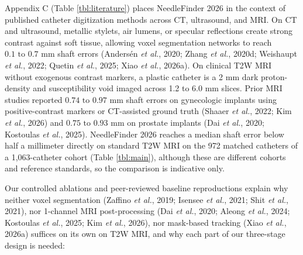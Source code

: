 \documentclass[
  11pt,
]{article}
\begin{document}
Appendix C (Table \ref{tbl:literature}) places NeedleFinder 2026 in the
context of published catheter digitization methods across CT,
ultrasound, and MRI. On CT and ultrasound, metallic stylets, air lumens,
or specular reflections create strong contrast against soft tissue,
allowing voxel segmentation networks to reach
\(0.1\text{ to }0.7\text{ mm}\) shaft errors (Andersén \emph{et al.},
2020; Zhang \emph{et al.}, 2020d; Weishaupt \emph{et al.}, 2022; Quetin
\emph{et al.}, 2025; Xiao \emph{et al.}, 2026a). On clinical T2W MRI
without exogenous contrast markers, a plastic catheter is a 2 mm dark
proton-density and susceptibility void imaged across 1.2 to 6.0 mm
slices. Prior MRI studies reported \(0.74\text{ to }0.97\text{ mm}\)
shaft errors on gynecologic implants using positive-contrast markers or
CT-assisted ground truth (Shaaer \emph{et al.}, 2022; Kim \emph{et al.},
2026) and \(0.75\text{ to }0.93\text{ mm}\) on prostate implants (Dai
\emph{et al.}, 2020; Kostoulas \emph{et al.}, 2025). NeedleFinder 2026
reaches a median shaft error below half a millimeter directly on
standard T2W MRI on the 972 matched catheters of a 1,063-catheter cohort
(Table \ref{tbl:main}), although these are different cohorts and
reference standards, so the comparison is indicative only.

Our controlled ablations and peer-reviewed baseline reproductions
explain why neither voxel segmentation (Zaffino \emph{et al.}, 2019;
Isensee \emph{et al.}, 2021; Shit \emph{et al.}, 2021), nor 1-channel
MRI post-processing (Dai \emph{et al.}, 2020; Aleong \emph{et al.},
2024; Kostoulas \emph{et al.}, 2025; Kim \emph{et al.}, 2026), nor
mask-based tracking (Xiao \emph{et al.}, 2026a) suffices on its own on
T2W MRI, and why each part of our three-stage design is needed:
\end{document}
